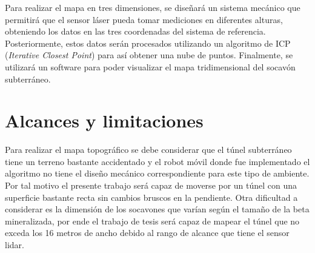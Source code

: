 Para realizar el mapa en tres dimensiones, se diseñar\'a un sistema mec\'anico que permitir\'a que el sensor l\'aser pueda tomar mediciones en diferentes alturas, obteniendo los datos en las tres coordenadas del sistema de referencia. Posteriormente, estos datos serán procesados utilizando un algoritmo de ICP (\textit{Iterative Closest Point}) para as\'i obtener una nube de puntos. Finalmente, se utilizar\'a un software para poder visualizar el mapa tridimensional del socavón subterr\'aneo.



\section{Alcances y limitaciones}

Para realizar el mapa topogr\'afico se debe considerar que el t\'unel subterr\'aneo tiene un terreno bastante accidentado y el robot m\'ovil donde fue implementado el algoritmo no tiene el diseño mec\'anico correspondiente para este tipo de ambiente. Por tal motivo el presente trabajo ser\'a capaz de moverse por un t\'unel con una superficie bastante recta sin cambios bruscos en la pendiente. Otra dificultad a considerar es la dimensi\'on de los socavones que var\'ian seg\'un el tama\~no de la beta mineralizada, por ende el trabajo de tesis ser\'a capaz de mapear el t\'unel que no exceda los 16 metros de ancho debido al rango de alcance que tiene el sensor lidar. 

